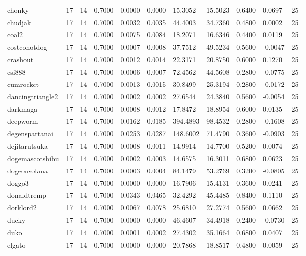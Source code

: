 \begin{table}[htbp]
\begin{tabular}{lllllllllll}
chonky & 17 & 14 & 0.7000 & 0.0000 & 0.0000 & 15.3052 & 15.5023 & 0.6400 & 0.0697 & 25 \\
chudjak & 17 & 14 & 0.7000 & 0.0032 & 0.0035 & 44.4003 & 34.7360 & 0.4800 & 0.0002 & 25 \\
coal2 & 17 & 14 & 0.7000 & 0.0075 & 0.0084 & 18.2071 & 16.6346 & 0.4400 & 0.0119 & 25 \\
costcohotdog & 17 & 14 & 0.7000 & 0.0007 & 0.0008 & 37.7512 & 49.5234 & 0.5600 & -0.0047 & 25 \\
crashout & 17 & 14 & 0.7000 & 0.0012 & 0.0014 & 22.3171 & 20.8750 & 0.6000 & 0.1270 & 25 \\
csi888 & 17 & 14 & 0.7000 & 0.0006 & 0.0007 & 72.4562 & 44.5608 & 0.2800 & -0.0775 & 25 \\
cumrocket & 17 & 14 & 0.7000 & 0.0013 & 0.0015 & 30.8499 & 25.3194 & 0.2800 & -0.0172 & 25 \\
dancingtriangle2 & 17 & 14 & 0.7000 & 0.0002 & 0.0002 & 27.6544 & 24.3840 & 0.5600 & -0.0054 & 25 \\
darkmaga & 17 & 14 & 0.7000 & 0.0008 & 0.0012 & 17.8472 & 18.8954 & 0.6000 & 0.0135 & 25 \\
deepworm & 17 & 14 & 0.7000 & 0.0162 & 0.0185 & 394.4893 & 98.4532 & 0.2800 & -0.1608 & 25 \\
degenspartanai & 17 & 14 & 0.7000 & 0.0253 & 0.0287 & 148.6002 & 71.4790 & 0.3600 & -0.0903 & 25 \\
dejitarutsuka & 17 & 14 & 0.7000 & 0.0008 & 0.0011 & 14.9914 & 14.7700 & 0.5200 & 0.0074 & 25 \\
dogemascotshibu & 17 & 14 & 0.7000 & 0.0002 & 0.0003 & 14.6575 & 16.3011 & 0.6800 & 0.0623 & 25 \\
dogeonsolana & 17 & 14 & 0.7000 & 0.0003 & 0.0004 & 84.1479 & 53.2769 & 0.3200 & -0.0805 & 25 \\
doggo3 & 17 & 14 & 0.7000 & 0.0000 & 0.0000 & 16.7906 & 15.4131 & 0.3600 & 0.0241 & 25 \\
donaldtremp & 17 & 14 & 0.7000 & 0.0343 & 0.0465 & 32.4292 & 45.4485 & 0.8400 & 0.1110 & 25 \\
dorklord2 & 17 & 14 & 0.7000 & 0.0067 & 0.0078 & 25.6810 & 27.2774 & 0.5600 & 0.0662 & 25 \\
ducky & 17 & 14 & 0.7000 & 0.0000 & 0.0000 & 46.4607 & 34.4918 & 0.2400 & -0.0730 & 25 \\
duko & 17 & 14 & 0.7000 & 0.0001 & 0.0002 & 27.4302 & 35.1664 & 0.6800 & 0.0407 & 25 \\
elgato & 17 & 14 & 0.7000 & 0.0000 & 0.0000 & 20.7868 & 18.8517 & 0.4800 & 0.0059 & 25 \\

\end{tabular}
\end{table}
